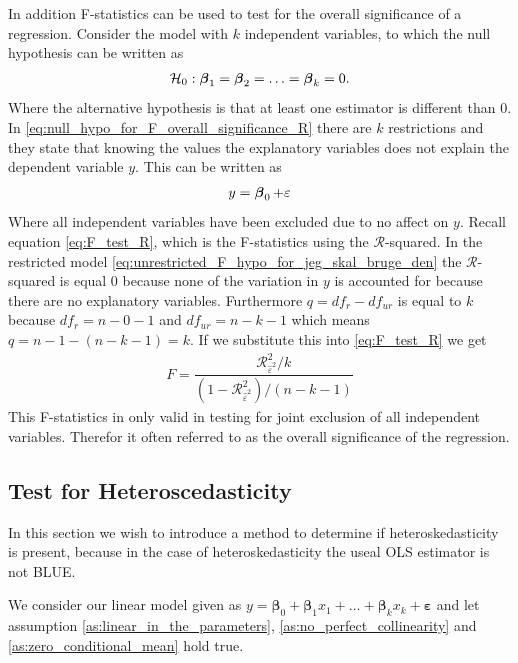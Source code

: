 In addition F-statistics can be used to test for the overall significance of a regression. Consider the model with $k$ independent variables, to which the null hypothesis can be written as
\begin{align}\label{eq:null_hypo_for_F_overall_significance_R}
    \mathcal{H}_0: \operatorname{\boldsymbol{\beta}}_1 = \operatorname{\boldsymbol{\beta}}_2 = \ldots = \operatorname{\boldsymbol{\beta}}_k = 0.
\end{align}
Where the alternative hypothesis is that at least one estimator is different than $0$. In \eqref{eq:null_hypo_for_F_overall_significance_R} there are $k$ restrictions and they state that knowing the values the explanatory variables does not explain the dependent variable $y$. This can be written as
\begin{align}\label{eq:unrestricted_F_hypo_for_jeg_skal_bruge_den}
    y = \operatorname{\boldsymbol{\beta}}_0 + \varepsilon
\end{align}
Where all independent variables have been excluded due to no affect on $y$. Recall equation \eqref{eq:F_test_R}, which is the F-statistics using the $\mathcal{R}$-squared. In the restricted model \eqref{eq:unrestricted_F_hypo_for_jeg_skal_bruge_den} the $\mathcal{R}$-squared is equal $0$ because none of the variation in $y$ is accounted for because there are no explanatory variables. Furthermore $q = df_r - df_{ur}$ is equal to $k$ because $df_r = n-0-1$ and $df_{ur} = n-k-1$ which means $q = n-1 - (n-k-1) = k$. If we substitute this into \eqref{eq:F_test_R} we get
\begin{align}\label{eq:udvidelse_til_F_stat}
    F = \dfrac{\mathcal{R}^2_{\hat{\varepsilon}^2}/k}{(1-\mathcal{R}^2_{\hat{\varepsilon}^2}) / (n-k-1)}
\end{align}
This F-statistics in only valid in testing for joint exclusion of all independent variables. Therefor it often referred to as the overall significance of the regression. 






\subsection{Test for Heteroscedasticity}
In this section we wish to introduce a method to determine if heteroskedasticity is present, because in the case of heteroskedasticity the useal OLS estimator is not BLUE. 

We consider our linear model given as $y = \mathbf{\beta}_0 + \mathbf{\beta}_1x_1 + \ldots + \mathbf{\beta}_kx_k + \mathbf{\varepsilon}$ and let assumption \ref{as:linear_in_the_parameters}, \ref{as:no_perfect_collinearity} and \ref{as:zero_conditional_mean} hold true.

